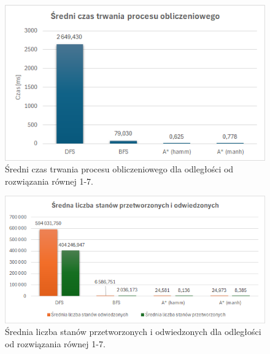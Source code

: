 \documentclass{classrep}
\begin{document}
{    \begin{figure}[!h]
        \centering
        \includegraphics[width=\textwidth,height=\textheight,keepaspectratio]{average-time-with-dfs}
        \caption{Średni czas trwania procesu obliczeniowego dla odległości od rozwiązania równej 1-7.}
        \label{fig:1}
    \end{figure}

    \begin{figure}[!h]
        \centering
        \includegraphics[width=\textwidth,height=\textheight,keepaspectratio]{average-count-of-visited-with-dfs}
        \caption{Średnia liczba stanów przetworzonych i odwiedzonych dla odległości od rozwiązania równej 1-7.}
        \label{fig:2}
    \end{figure}



}
\end{document}
